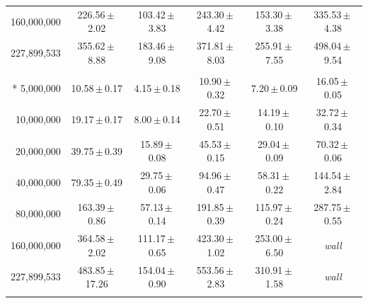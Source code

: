 \begin{table}[htbp]
{\begin{tabular}{@{}rccccc@{}}
160{,}000{,}000 & 226.56\,$\pm$\,2.02 & 103.42\,$\pm$\,3.83 & 243.30\,$\pm$\,4.42 & 153.30\,$\pm$\,3.38 & 335.53\,$\pm$\,4.38 \\
227{,}899{,}533 & 355.62\,$\pm$\,8.88 & 183.46\,$\pm$\,9.08 & 371.81\,$\pm$\,8.03 & 255.91\,$\pm$\,7.55 & 498.04\,$\pm$\,9.54 \\
\addlinespace[3pt]
\multicolumn{6}{@{}l}{\textit{Trino~473 (disk connector)}}\\*
5{,}000{,}000 & 10.58\,$\pm$\,0.17 & 4.15\,$\pm$\,0.18 & 10.90\,$\pm$\,0.32 & 7.20\,$\pm$\,0.09 & 16.05\,$\pm$\,0.05 \\
10{,}000{,}000 & 19.17\,$\pm$\,0.17 & 8.00\,$\pm$\,0.14 & 22.70\,$\pm$\,0.51 & 14.19\,$\pm$\,0.10 & 32.72\,$\pm$\,0.34 \\
20{,}000{,}000 & 39.75\,$\pm$\,0.39 & 15.89\,$\pm$\,0.08 & 45.53\,$\pm$\,0.15 & 29.04\,$\pm$\,0.09 & 70.32\,$\pm$\,0.06 \\
40{,}000{,}000 & 79.35\,$\pm$\,0.49 & 29.75\,$\pm$\,0.06 & 94.96\,$\pm$\,0.47 & 58.31\,$\pm$\,0.22 & 144.54\,$\pm$\,2.84 \\
80{,}000{,}000 & 163.39\,$\pm$\,0.86 & 57.13\,$\pm$\,0.14 & 191.85\,$\pm$\,0.39 & 115.97\,$\pm$\,0.24 & 287.75\,$\pm$\,0.55 \\
160{,}000{,}000 & 364.58\,$\pm$\,2.02 & 111.17\,$\pm$\,0.65 & 423.30\,$\pm$\,1.02 & 253.00\,$\pm$\,6.50 & \textit{wall} \\
227{,}899{,}533 & 483.85\,$\pm$\,17.26 & 154.04\,$\pm$\,0.90 & 553.56\,$\pm$\,2.83 & 310.91\,$\pm$\,1.58 & \textit{wall} \\
\addlinespace[3pt]
\bottomrule
\end{tabular}}
\end{table}

